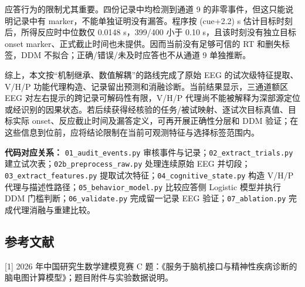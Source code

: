 \documentclass[
]{article}
\begin{document}
应答行为的限制尤其重要。四份记录中均检测到通道 9
的非零事件，但这只能说明记录中有 marker，不能单独证明没有漏答。程序按
(cue+2.2) s 估计目标时刻后，所得反应时中位数仅 0.0148 s，399/400 小于
0.10 s，且该时刻没有独立目标 onset
marker、正式截止时间也未提供。因而当前没有足够可信的 RT 和删失标签，DDM
不拟合；正确/错误/未及时应答也不从通道 9 单独推断。

综上，本文按``机制继承、数值解耦''的路线完成了原始 EEG
的试次级特征提取、V/H/P
功能代理构造、记录留出预测和消融诊断。当前结果显示，三通道额区 EEG
对左右提示的跨记录可解码性有限，V/H/P
代理尚不能被解释为深部源定位或经识别的因果状态。若后续获得经核验的任务/被试映射、逐试次目标真值、目标实际
onset、反应截止时间及漏答定义，可再开展正确性分层和 DDM
验证；在这些信息到位前，应将结论限制在当前可观测特征与选择标签范围内。

\textbf{代码对应关系：} \texttt{01\_audit\_events.py}
审核事件与记录；\texttt{02\_extract\_trials.py}
建立试次表；\texttt{02b\_preprocess\_raw.py} 处理连续原始 EEG
并切段；\texttt{03\_extract\_features.py}
提取试次特征；\texttt{04\_cognitive\_state.py} 构造 V/H/P
代理与描述性路径；\texttt{05\_behavior\_model.py} 比较应答侧 Logistic
模型并执行 DDM 门槛判断；\texttt{06\_validate.py} 完成留一记录 EEG
验证；\texttt{07\_ablation.py} 完成代理消融与重建比较。

\hypertarget{ux53c2ux8003ux6587ux732e}{%
\subsection{参考文献}\label{ux53c2ux8003ux6587ux732e}}

{[}1{]} 2026 年中国研究生数学建模竞赛 C
题：《服务于脑机接口与精神性疾病诊断的脑电图计算模型》；题目附件与实验数据说明。
\end{document}

